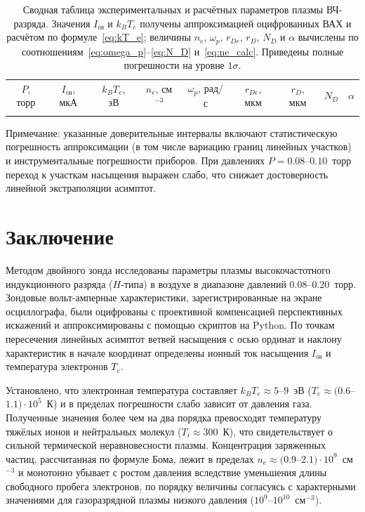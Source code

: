 \documentclass[reprint, amsmath, amssymb, aps, pra, nofootinbib]{revtex4-2}
\begin{document}
\begin{table}[t!]
    \caption{Сводная таблица экспериментальных и расчётных параметров плазмы ВЧ-разряда. Значения $I_{i\text{н}}$ и $k_B T_e$ получены аппроксимацией оцифрованных ВАХ и расчётом по формуле~\eqref{eq:kT_e}; величины $n_e$, $\omega_p$, $r_{De}$, $r_D$, $N_D$ и $\alpha$ вычислены по соотношениям~\eqref{eq:omega_p}--\eqref{eq:N_D} и~\eqref{eq:ne_calc}. Приведены полные погрешности на уровне $1\sigma$.}
    \label{tab:results}
    \begin{ruledtabular}
        \begin{tabular}{ccccccccc}
            $P$, торр & $I_{i\text{н}}$, мкА & $k_B T_e$, эВ & $n_e$, см$^{-3}$ & $\omega_p$, рад/с & $r_{De}$, мкм & $r_D$, мкм & $N_D$ & $\alpha$ \\
            \colrule
            
        \end{tabular}
    \end{ruledtabular}
    \raggedright\footnotesize Примечание: указанные доверительные интервалы включают статистическую погрешность аппроксимации (в том числе вариацию границ линейных участков) и инструментальные погрешности приборов. При давлениях $P = 0.08$--$0.10$~торр переход к участкам насыщения выражен слабо, что снижает достоверность линейной экстраполяции асимптот.
\end{table}


\section{Заключение}
Методом двойного зонда исследованы параметры плазмы высокочастотного индукционного разряда ($H$-типа) в воздухе в диапазоне давлений $0.08$--$0.20$~торр. Зондовые вольт-амперные характеристики, зарегистрированные на экране осциллографа, были оцифрованы с проективной компенсацией перспективных искажений и аппроксимированы с помощью скриптов на Python. По точкам пересечения линейных асимптот ветвей насыщения с осью ординат и наклону характеристик в начале координат определены ионный ток насыщения $I_{i\text{н}}$ и температура электронов $T_e$.

Установлено, что электронная температура составляет $k_B T_e \approx 5$--$9$~эВ ($T_e \approx (0.6$--$1.1)\cdot10^5$~К) и в пределах погрешности слабо зависит от давления газа. Полученные значения более чем на два порядка превосходят температуру тяжёлых ионов и нейтральных молекул ($T_i \approx 300$~К), что свидетельствует о сильной термической неравновесности плазмы. Концентрация заряженных частиц, рассчитанная по формуле Бома, лежит в пределах $n_e \approx (0.9$--$2.1)\cdot10^9$~см$^{-3}$ и монотонно убывает с ростом давления вследствие уменьшения длины свободного пробега электронов, по порядку величины согласуясь с характерными значениями для газоразрядной плазмы низкого давления ($10^9$--$10^{10}$~см$^{-3}$).
\end{document}

